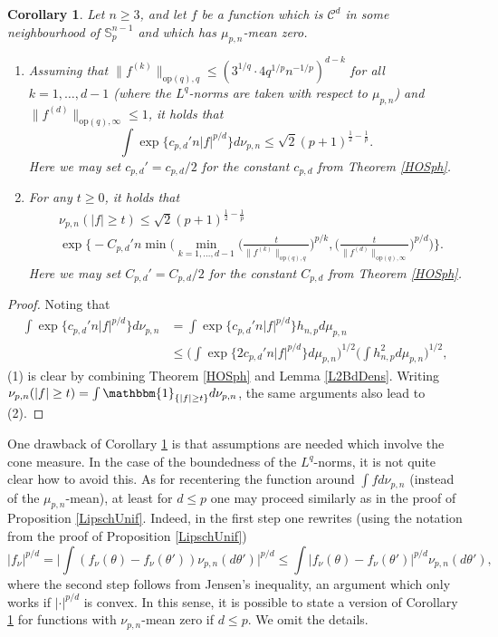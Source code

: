 \documentclass[a4paper,12pt]{amsart}
\numberwithin{equation}{section}
\newtheorem{korollar}[satz]{Corollary}
\theoremstyle{remark}
\def\S{{\mathbb S}}
\begin{document}
\begin{korollar}\label{KorSurfHO}
    Let $n \ge 3$, and let $f$ be a function which is $\mathcal{C}^d$ in some neighbourhood of $\S_p^{n-1}$ and which has $\mu_{p,n}$-mean zero.
    \begin{enumerate}
        \item Assuming that $\lVert f^{(k)} \rVert_{\mathrm{op}(q),q} \le (3^{1/q} \cdot 4 q^{1/p} n^{-1/p})^{d-k}$ for all $k=1,\ldots,d-1$ (where the $L^q$-norms are taken with respect to $\mu_{p,n}$) and $\lVert f^{(d)} \rVert_{\mathrm{op}(q),\infty} \le 1$, it holds that
        \[
        \int \exp\Big\{c_{p,d}'n |f|^{p/d} \Big\} d\nu_{p,n} \le \sqrt{2} (p+1)^{\frac{1}{2} - \frac{1}{p}}.
        \]
        Here we may set $c_{p,d}' = c_{p,d}/2$ for the constant $c_{p,d}$ from Theorem \ref{HOSph}.
        \item For any $t\ge 0$, it holds that
        \begin{align*}
        &\nu_{p,n}(|f| \ge t)\le \sqrt{2} (p+1)^{\frac{1}{2} - \frac{1}{p}}\\
        &\exp\Big\{- C_{p,d}'n \min\Big(\min_{k=1, \ldots,d-1} \Big(\frac{t}{\lVert f^{(k)} \rVert_{\mathrm{op}(q),q}}\Big)^{p/k}, \Big(\frac{t}{\lVert f^{(d)} \rVert_{\mathrm{op}(q),\infty}}\Big)^{p/d}\Big)\Big\}.
        \end{align*}
    Here we may set $C_{p,d}' = C_{p,d}/2$ for the constant $C_{p,d}$ from Theorem \ref{HOSph}.
    \end{enumerate}
\end{korollar}

\begin{proof}
    Noting that
    \begin{align*}
    \int \exp\Big\{c_{p,d}'n |f|^{p/d} \Big\} d\nu_{p,n} &= \int \exp\Big\{c_{p,d}'n |f|^{p/d} \Big\} h_{n,p} d\mu_{p,n}\\
    &\le \Big(\int \exp\Big\{2c_{p,d}'n |f|^{p/d} \Big\} d\mu_{p,n}\Big)^{1/2} \Big( \int h_{n,p}^2 d\mu_{p,n} \Big)^{1/2},
    \end{align*}
    (1) is clear by combining Theorem \ref{HOSph} and Lemma \ref{L2BdDens}. Writing $\nu_{p,n}(|f| \ge t) = \int \mathbbm{1}_{\{|f| \ge t\}} d\nu_{p,n}$, the same arguments also lead to (2).
\end{proof}

One drawback of Corollary \ref{KorSurfHO} is that assumptions are needed which involve the cone measure. In the case of the boundedness of the $L^q$-norms, it is not quite clear how to avoid this. As for recentering the function around $\int f d\nu_{p,n}$ (instead of the $\mu_{p,n}$-mean), at least for $d \le p$ one may proceed similarly as in the proof of Proposition \ref{LipschUnif}. Indeed, in the first step one rewrites (using the notation from the proof of Proposition \ref{LipschUnif})
\[
|f_\nu|^{p/d} = \Big| \int (f_\nu(\theta) - f_\nu(\theta')) \nu_{p,n}(d\theta')\Big|^{p/d} \le \int |f_\nu(\theta) - f_\nu(\theta')|^{p/d} \nu_{p,n}(d\theta'),
\]
where the second step follows from Jensen's inequality, an argument which only works if $|\cdot|^{p/d}$ is convex. In this sense, it is possible to state a version of Corollary \ref{KorSurfHO} for functions with $\nu_{p,n}$-mean zero if $d \le p$. We omit the details.
\end{document}
